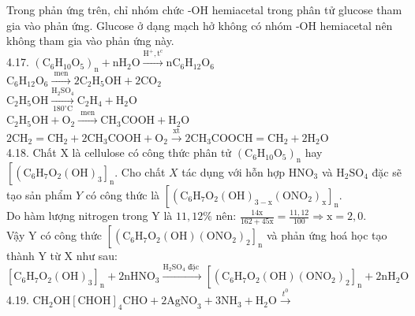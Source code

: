\documentclass[10pt]{article}
\begin{document}
Trong phản ứng trên, chỉ nhóm chức -OH hemiacetal trong phân tử glucose tham gia vào phản ứng. Glucose ở dạng mạch hở không có nhóm -OH hemiacetal nên không tham gia vào phản ứng này.\\
4.17. $\left(\mathrm{C}_{6} \mathrm{H}_{10} \mathrm{O}_{5}\right)_{\mathrm{n}}+\mathrm{nH}_{2} \mathrm{O} \xrightarrow{\mathrm{H}^{+}, \mathrm{t}^{\mathrm{c}}} \mathrm{nC}_{6} \mathrm{H}_{12} \mathrm{O}_{6}$\\
$\mathrm{C}_{6} \mathrm{H}_{12} \mathrm{O}_{6} \xrightarrow{\text { men }} 2 \mathrm{C}_{2} \mathrm{H}_{5} \mathrm{OH}+2 \mathrm{CO}_{2}$\\
$\mathrm{C}_{2} \mathrm{H}_{5} \mathrm{OH} \xrightarrow[180^{\circ} \mathrm{C}]{\mathrm{H}_{2} \mathrm{SO}_{4}} \mathrm{C}_{2} \mathrm{H}_{4}+\mathrm{H}_{2} \mathrm{O}$\\
$\mathrm{C}_{2} \mathrm{H}_{5} \mathrm{OH}+\mathrm{O}_{2} \xrightarrow{\text { men }} \mathrm{CH}_{3} \mathrm{COOH}+\mathrm{H}_{2} \mathrm{O}$\\
$2 \mathrm{CH}_{2}=\mathrm{CH}_{2}+2 \mathrm{CH}_{3} \mathrm{COOH}+\mathrm{O}_{2} \xrightarrow{\mathrm{xt}} 2 \mathrm{CH}_{3} \mathrm{COOCH}=\mathrm{CH}_{2}+2 \mathrm{H}_{2} \mathrm{O}$\\
4.18. Chất X là cellulose có công thức phân tử $\left(\mathrm{C}_{6} \mathrm{H}_{10} \mathrm{O}_{5}\right)_{\mathrm{n}}$ hay $\left[\left(\mathrm{C}_{6} \mathrm{H}_{7} \mathrm{O}_{2}(\mathrm{OH})_{3}\right]_{\mathrm{n}}\right.$. Cho chất $X$ tác dụng với hỗn hợp $\mathrm{HNO}_{3}$ và $\mathrm{H}_{2} \mathrm{SO}_{4}$ đặc sẽ tạo sản phẩm $Y$ có công thức là $\left[\left(\mathrm{C}_{6} \mathrm{H}_{7} \mathrm{O}_{2}(\mathrm{OH})_{3-\mathrm{x}}\left(\mathrm{ONO}_{2}\right)_{\mathrm{x}}\right]_{\mathrm{n}}\right.$.\\
Do hàm lượng nitrogen trong Y là $11,12 \%$ nên: $\frac{14 \mathrm{x}}{162+45 \mathrm{x}}=\frac{11,12}{100} \Rightarrow \mathrm{x}=2,0$.\\
Vậy Y có công thức $\left[\left(\mathrm{C}_{6} \mathrm{H}_{7} \mathrm{O}_{2}(\mathrm{OH})\left(\mathrm{ONO}_{2}\right)_{2}\right]_{\mathrm{n}}\right.$ và phản ứng hoá học tạo thành Y từ X như sau:\\
$\left[\mathrm{C}_{6} \mathrm{H}_{7} \mathrm{O}_{2}(\mathrm{OH})_{3}\right]_{\mathrm{n}}+2 \mathrm{nHNO}_{3} \xrightarrow{\mathrm{H}_{2} \mathrm{SO}_{4} \text { đặc }}\left[\left(\mathrm{C}_{6} \mathrm{H}_{7} \mathrm{O}_{2}(\mathrm{OH})\left(\mathrm{ONO}_{2}\right)_{2}\right]_{\mathrm{n}}+2 \mathrm{nH}_{2} \mathrm{O}\right.$\\
4.19. $\mathrm{CH}_{2} \mathrm{OH}[\mathrm{CHOH}]_{4} \mathrm{CHO}+2 \mathrm{AgNO}_{3}+3 \mathrm{NH}_{3}+\mathrm{H}_{2} \mathrm{O} \xrightarrow{t^{0}}$
\end{document}
